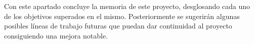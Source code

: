\begin{comment}
Todo proyecto debe incluir las conclusiones que se derivan de su desarrollo. Éstas pueden ser de diferente índole, dependiendo de la tipología del proyecto, pero normalmente van a estar presentes un conjunto de conclusiones relacionadas con los resultados del proyecto y un conjunto de conclusiones técnicas. 
Además, resulta muy útil realizar un informe crítico indicando cómo se puede mejorar el proyecto, o cómo se puede continuar trabajando en la línea del proyecto realizado. 
\end{comment}

Con este apartado concluye la memoria de este proyecto, desglosando cada uno de los objetivos superados en el mismo. Posteriormente se sugerirán algunas posibles líneas de trabajo futuras que puedan dar continuidad al proyecto consiguiendo una mejora notable.

